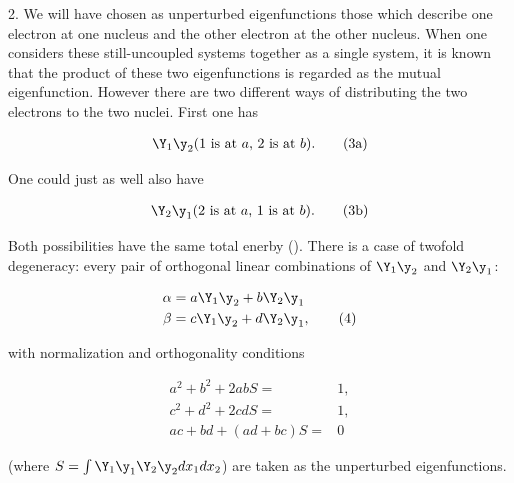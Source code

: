 \documentclass{article}
\newcommand{\nequ}[2]{
\begin{align*}
#1
\tag{#2}
\end{align*}
}
\begin{document}
2. We will have chosen as unperturbed eigenfunctions those which describe one electron at one nucleus and the other electron at the other nucleus. When one considers these still-uncoupled systems together as a single system, it is known that the product of these two eigenfunctions is regarded as the mutual eigenfunction. However there are two different ways of distributing the two electrons to the two nuclei. First one has
\nequ{
\Y_1 \y_2 \text{($1$ is at $a$, $2$ is at $b$)}.
}{3a}
One could just as well also have
\nequ{
\Y_2 \y_1 \text{($2$ is at $a$, $1$ is at $b$)}.
}{3b}

Both possibilities have the same total enerby (). There is a case of twofold degeneracy: every pair of orthogonal linear combinations of $\Y_1 \y_2$ and $\Y_2 \y_1$:
\nequ{
\alpha &= a\Y_1 \y_2 + b\Y_2
\y_1\\
\beta  &= c\Y_1 \y_2 + d\Y_2 \y_1,}{4}

with normalization and orthogonality conditions
\nequ{
a^2 + b^2 + 2abS =& 1,\\
c^2 + d^2 + 2cdS =& 1,\\
ac + bd + (ad + bc)S =& 0
}{5}
(where $S=\int\Y_1 \y_1 \Y_2 \y_2 dx_1 dx_2$) are taken as the unperturbed eigenfunctions.
\end{document}
